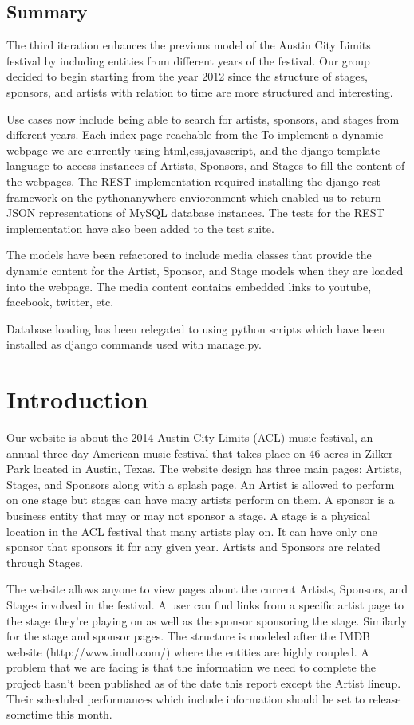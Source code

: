 \documentclass[12pt,english]{scrartcl}
\begin{document}
\subsection{Summary}
The third iteration enhances the previous model of the Austin City Limits festival by including entities
from different years of the festival. Our group decided to begin starting from the year 2012 since the structure of
stages, sponsors, and artists with relation to time are more structured and interesting. 

Use cases now include being able to search for artists, sponsors, and stages from different years. Each index page reachable
from the 
To implement a dynamic webpage we are currently using html,css,javascript, and the django template language to access instances of Artists, Sponsors, and Stages to fill the content of the webpages. 
The REST implementation required installing the django rest framework on the pythonanywhere envioronment which enabled us to return JSON representations of MySQL database instances. 
The tests for the REST implementation have also been added to the test suite.

The models have been refactored to include media classes that provide the dynamic content for the Artist,
Sponsor, and Stage models when they are loaded into the webpage. The media content contains embedded links to youtube, facebook, twitter, etc. 

Database loading has been relegated to using python scripts which have been installed as django commands used with manage.py. 
\section{Introduction}
Our website is about the 2014 Austin City Limits (ACL) music festival, an annual three-day American music festival that takes place on 46-acres in Zilker Park located in Austin, Texas. 
The website design has three main pages: Artists, Stages, and Sponsors along with a splash page. An Artist is allowed to perform on one stage but stages can have many artists perform on them.
A sponsor is a business entity that may or may not sponsor a stage. A stage is a physical location in the ACL festival that many artists play on. 
It can have only one sponsor that sponsors it for any given year. Artists and Sponsors are related through Stages.

The website allows anyone to view pages about the current Artists, Sponsors, and Stages involved in the festival. A user can find links from a specific artist page to the stage they're playing on
as well as the sponsor sponsoring the stage. Similarly for the stage and sponsor pages. The structure is modeled after the IMDB website (http://www.imdb.com/) where the entities are highly coupled.
A problem that we are facing is that the information we need to complete the project hasn't been published as of the date this report except the Artist lineup. Their scheduled performances which 
include information should be set to release sometime this month.
\end{document}
